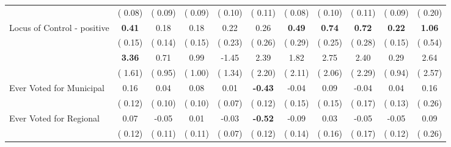 \begin{tabular}{l c c c c c c c c c c}
& (     0.08) & (     0.09) & (     0.09) & (     0.10) & (     0.11) & (     0.08) & (     0.10) & (     0.11) & (     0.09) & (     0.20) \\
Locus of Control - positive & \textbf{      0.41 } &      0.18 &      0.18 &      0.22 &      0.26 & \textbf{      0.49 } & \textbf{      0.74 } & \textbf{      0.72 } & \textbf{     0.22} & \textbf{     1.06} \\
& (     0.15) & (     0.14) & (     0.15) & (     0.23) & (     0.26) & (     0.29) & (     0.25) & (     0.28) & (     0.15) & (     0.54) \\
& \textbf{      3.36 } &      0.71 &      0.99 &     -1.45 &      2.39 &      1.82 &      2.75 &      2.40 &      0.29 &      2.64 \\
& (     1.61) & (     0.95) & (     1.00) & (     1.34) & (     2.20) & (     2.11) & (     2.06) & (     2.29) & (     0.94) & (     2.57) \\
Ever Voted for Municipal &      0.16 &      0.04 &      0.08 &      0.01 & \textbf{     -0.43 } &     -0.04 &      0.09 &     -0.04 &      0.04 &      0.16 \\
& (     0.12) & (     0.10) & (     0.10) & (     0.07) & (     0.12) & (     0.15) & (     0.15) & (     0.17) & (     0.13) & (     0.26) \\
Ever Voted for Regional &      0.07 &     -0.05 &      0.01 &     -0.03 & \textbf{     -0.52 } &     -0.09 &      0.03 &     -0.05 &     -0.05 &      0.09 \\
& (     0.12) & (     0.11) & (     0.11) & (     0.07) & (     0.12) & (     0.14) & (     0.16) & (     0.17) & (     0.12) & (     0.26) \\
\bottomrule
\end{tabular}
